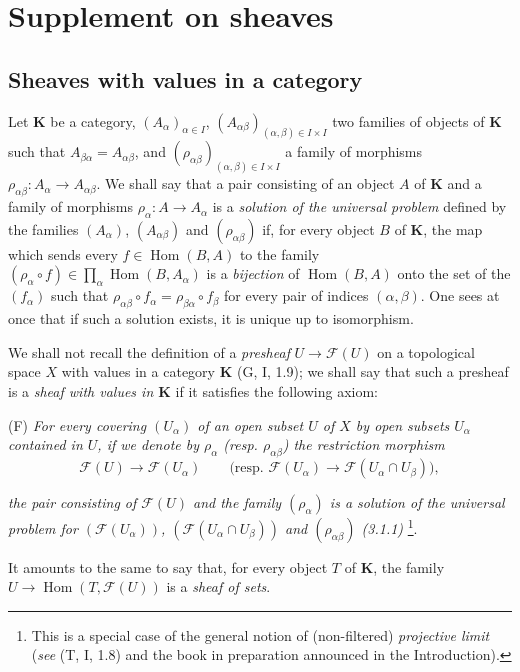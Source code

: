 \section{Supplement on sheaves}
\label{section:0.3}

\subsection{Sheaves with values in a category}
\label{subsection:0.3.1}

\begin{env}[3.1.1]
\label{0.3.1.1}
Let $\mathbf{K}$ be a category, $(A_\alpha)_{\alpha\in I}$,
$(A_{\alpha\beta})_{(\alpha,\beta)\in I\times I}$ two families of objects of
$\mathbf{K}$ such that $A_{\beta\alpha}=A_{\alpha\beta}$, and
$(\rho_{\alpha\beta})_{(\alpha,\beta)\in I\times I}$ a family of morphisms
$\rho_{\alpha\beta}:A_\alpha\to A_{\alpha\beta}$. We shall say that a pair
consisting of an object $A$ of $\mathbf{K}$ and a family of morphisms
$\rho_\alpha:A\to A_\alpha$ is a \emph{solution of the universal problem} defined
by the families $(A_\alpha)$, $(A_{\alpha\beta})$ and
$(\rho_{\alpha\beta})$ if, for every object $B$ of $\mathbf{K}$, the map
which sends every $f\in\operatorname{Hom}(B,A)$ to the family
$(\rho_\alpha\circ f)\in\prod_\alpha\operatorname{Hom}(B,A_\alpha)$ is a
\emph{bijection} of $\operatorname{Hom}(B,A)$ onto the set of the $(f_\alpha)$
such that
$\rho_{\alpha\beta}\circ f_\alpha=\rho_{\beta\alpha}\circ f_\beta$ for every
pair of indices $(\alpha,\beta)$. One sees at once that if such a
solution exists, it is unique up to isomorphism.
\end{env}

\begin{env}[3.1.2]
\label{0.3.1.2}
We shall not recall the definition of a \emph{presheaf}
$U\to\mathcal{F}(U)$ on a topological space $X$ with values in a
category $\mathbf{K}$ (G, I, 1.9); we shall say that such a presheaf is a
\emph{sheaf with values in $\mathbf{K}$} if it satisfies the following
axiom:

\smallskip
\noindent
\textup{(F)} \emph{For every covering $(U_\alpha)$ of an open subset $U$ of $X$
by open subsets $U_\alpha$ contained in $U$, if we denote by $\rho_\alpha$
(resp. $\rho_{\alpha\beta}$) the restriction morphism}
\[
  \mathcal{F}(U)\to\mathcal{F}(U_\alpha)
  \qquad
  \bigl(\text{resp. }\mathcal{F}(U_\alpha)
  \to\mathcal{F}(U_\alpha\cap U_\beta)\bigr),
\]


\emph{the pair consisting of $\mathcal{F}(U)$ and the family $(\rho_\alpha)$ is a
solution of the universal problem for $(\mathcal{F}(U_\alpha))$,
$(\mathcal{F}(U_\alpha\cap U_\beta))$ and $(\rho_{\alpha\beta})$ (3.1.1)}%
\footnote{This is a special case of the general notion of (non-filtered)
\emph{projective limit} (\emph{see} (T, I, 1.8) and the book in preparation
announced in the Introduction).}.

It amounts to the same to say that, for every object $T$ of $\mathbf{K}$, the
family $U\to\operatorname{Hom}(T,\mathcal{F}(U))$ is a \emph{sheaf
of sets}.
\end{env}

